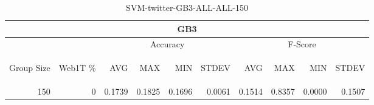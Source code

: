 \begin{center}
\begin{table}[htbp] 
 \begin{center}
\begin{tabular}{ | r | r | r | r | r | r | r | r | r | r |}
\hline
\multicolumn{10}{|c|}{GB3}\\
\hline
 & & \multicolumn{4}{|c|}{Accuracy} & \multicolumn{4}{|c|}{F-Score}\\ \cline{3-10}
\begin{sideways}Group Size\end{sideways} & \begin{sideways}Web1T \%\end{sideways} & \begin{sideways}AVG\end{sideways} & \begin{sideways}MAX\end{sideways} & \begin{sideways}MIN\end{sideways} & \begin{sideways}STDEV\end{sideways} & \begin{sideways}AVG\end{sideways} & \begin{sideways}MAX\end{sideways} & \begin{sideways}MIN\end{sideways} & \begin{sideways}STDEV\end{sideways}\\
\hline
\multirow{0}{*}{150}
 & 0 & 0.1739 & 0.1825 & 0.1696 & 0.0061 & 0.1514 & 0.8357 & 0.0000 & 0.1507\\ \cline{2-10}
\hline
\end{tabular}
\caption{SVM-twitter-GB3-ALL-ALL-150}
\label{table:SVM-twitter-GB3-ALL-ALL-150}
\end{center}
 \end{table}
\end{center}

